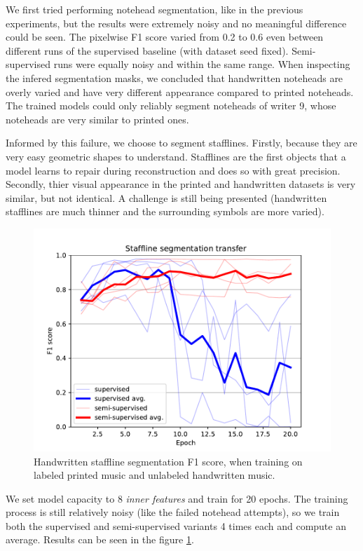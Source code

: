 We first tried performing notehead segmentation, like in the previous experiments, but the results were extremely noisy and no meaningful difference could be seen. The pixelwise F1 score varied from 0.2 to 0.6 even between different runs of the supervised baseline (with dataset seed fixed). Semi-supervised runs were equally noisy and within the same range. When inspecting the infered segmentation masks, we concluded that handwritten noteheads are overly varied and have very different appearance compared to printed noteheads. The trained models could only reliably segment noteheads of writer 9, whose noteheads are very similar to printed ones.

Informed by this failure, we choose to segment stafflines. Firstly, because they are very easy geometric shapes to understand. Stafflines are the first objects that a model learns to repair during reconstruction and does so with great precision. Secondly, thier visual appearance in the printed and handwritten datasets is very similar, but not identical. A challenge is still being presented (handwritten stafflines are much thinner and the surrounding symbols are more varied).

\begin{figure}[ht]
    \centering
    \includegraphics[width=140mm]{../../figures/04-staffline-transfer/transfer.pdf}
    \caption{Handwritten staffline segmentation F1 score, when training on labeled printed music and unlabeled handwritten music.}
    \label{fig:StafflineTransfer}
\end{figure}

We set model capacity to 8 \emph{inner features} and train for 20 epochs. The training process is still relatively noisy (like the failed notehead attempts), so we train both the supervised and semi-supervised variants 4 times each and compute an average. Results can be seen in the figure \ref{fig:StafflineTransfer}.

